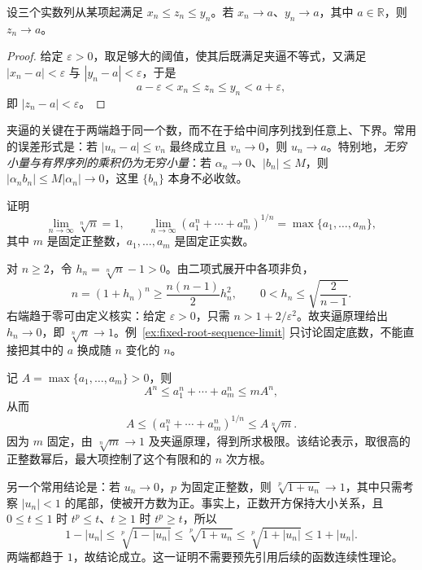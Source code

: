 \documentclass[UTF8,12pt,a4paper,fontset=fandol]{ctexbook}
\begin{document}
\begin{theorem}[夹逼收敛原理]
\label{thm:squeeze-principle-for-sequences}
设三个实数列从某项起满足 $x_n\leq z_n\leq y_n$。若 $x_n\to a$、$y_n\to a$，其中 $a\in\mathbb{R}$，则 $z_n\to a$。
\end{theorem}

\begin{proof}
给定 $\varepsilon>0$，取足够大的阈值，使其后既满足夹逼不等式，又满足 $|x_n-a|<\varepsilon$ 与 $|y_n-a|<\varepsilon$，于是
\[
    a-\varepsilon<x_n\leq z_n\leq y_n<a+\varepsilon,
\]
即 $|z_n-a|<\varepsilon$。
\end{proof}

夹逼的关键在于两端趋于同一个数，而不在于给中间序列找到任意上、下界。常用的误差形式是：若 $|u_n-a|\leq v_n$ 最终成立且 $v_n\to0$，则 $u_n\to a$。特别地，\emph{无穷小量与有界序列的乘积仍为无穷小量}：若 $\alpha_n\to0$、$|b_n|\leq M$，则 $|\alpha_n b_n|\leq M|\alpha_n|\to0$，这里 $\{b_n\}$ 本身不必收敛。

\begin{example}
\label{ex:nth-root-limits-by-squeeze}
证明
\[
    \lim_{n\to\infty}\sqrt[n]{n}=1,
    \qquad
    \lim_{n\to\infty}\left(a_1^n+\cdots+a_m^n\right)^{1/n}
    =\max\{a_1,\ldots,a_m\},
\]
其中 $m$ 是固定正整数，$a_1,\ldots,a_m$ 是固定正实数。
\end{example}

\begin{solve}
对 $n\geq2$，令 $h_n=\sqrt[n]{n}-1>0$。由二项式展开中各项非负，
\[
    n=(1+h_n)^n\geq\frac{n(n-1)}2h_n^2,
    \qquad 0<h_n\leq\sqrt{\frac2{n-1}}.
\]
右端趋于零可由定义核实：给定 $\varepsilon>0$，只需 $n>1+2/\varepsilon^2$。故夹逼原理给出 $h_n\to0$，即 $\sqrt[n]{n}\to1$。例~\ref{ex:fixed-root-sequence-limit} 只讨论固定底数，不能直接把其中的 $a$ 换成随 $n$ 变化的 $n$。

记 $A=\max\{a_1,\ldots,a_m\}>0$，则
\[
    A^n\leq a_1^n+\cdots+a_m^n\leq mA^n,
\]
从而
\[
    A\leq\left(a_1^n+\cdots+a_m^n\right)^{1/n}\leq A\sqrt[n]{m}.
\]
因为 $m$ 固定，由 $\sqrt[n]{m}\to1$ 及夹逼原理，得到所求极限。该结论表示，取很高的正整数幂后，最大项控制了这个有限和的 $n$ 次方根。
\end{solve}

另一个常用结论是：若 $u_n\to0$，$p$ 为固定正整数，则 $\sqrt[p]{1+u_n}\to1$，其中只需考察 $|u_n|<1$ 的尾部，使被开方数为正。事实上，正数开方保持大小关系，且 $0\leq t\leq1$ 时 $t^p\leq t$、$t\geq1$ 时 $t^p\geq t$，所以
\[
    1-|u_n|\leq\sqrt[p]{1-|u_n|}
    \leq\sqrt[p]{1+u_n}\leq\sqrt[p]{1+|u_n|}\leq1+|u_n|.
\]
两端都趋于 $1$，故结论成立。这一证明不需要预先引用后续的函数连续性理论。
\end{document}
